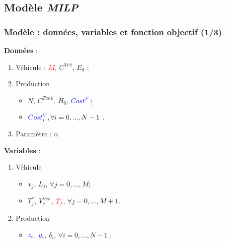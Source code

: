 \documentclass[hyperref={bookmarks=false},aspectratio=169]{beamer}
\begin{document}
\subsection{Modèle \textbf{\textit{MILP}}}%
\begin{frame}
\frametitle{Modèle : données, variables et fonction objectif (1/3)}
\begin{minipage}{.45\textwidth}%

\textbf{Données} :
\begin{enumerate}
	\item Véhicule : \textcolor{red}{$M$}, $C^{Veh}$, $E_0$ ;
	\item Production
		\begin{itemize}
		  \item $N$, $C^{Tank}$, $H_{0}$, \textcolor{blue}{$Cost^F$} ; 
            \item $\textcolor{blue}{Cost_i^V}, \forall i=0, ..., N-1$ .%
		\end{itemize}
	\item Paramètre : $\alpha$
\end{enumerate}
\pause
\textbf{Variables} :
\begin{enumerate}
	\item Véhicule
	   \begin{itemize}
		      \item $x_j$, $L_j$, $\forall j=0, ..., M$;
        
        \item  $T_j^*$, $V^{Veh}_j$, $\textcolor{red}{T_j}$,   $\forall j=0, ..., M+1$. 
	   \end{itemize}
		
	\item Production
		\begin{itemize}
				\item $\textcolor{blue}{z_i}$, $\textcolor{blue}{y_i}$, $\delta_i$, $\forall i=0, ..., N-1$ ;
    

\end{itemize}
\end{enumerate}
\end{minipage}
\end{frame}
\end{document}

